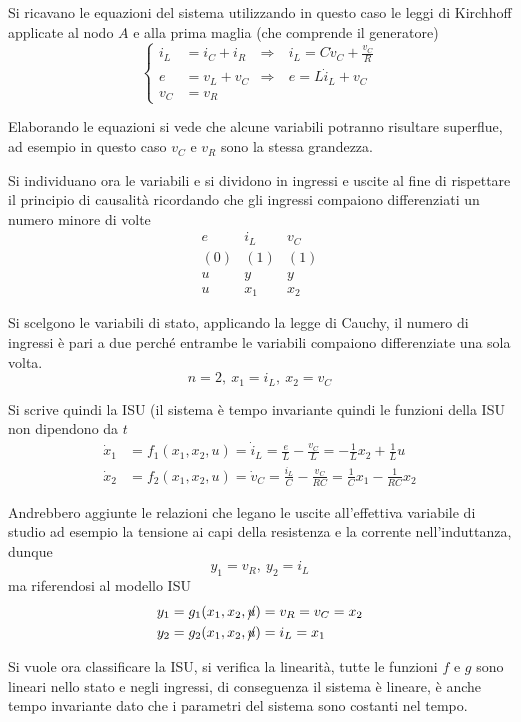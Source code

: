 Si ricavano le equazioni del sistema utilizzando in questo caso le leggi di Kirchhoff applicate al
nodo $A$ e alla prima maglia (che comprende il generatore)
$$\left\{\begin{aligned}
i_L &= i_C + i_R &\Rightarrow&\ i_L = C\dot{v}_C + \frac{v_C}{R}\\
e &= v_L + v_C &\Rightarrow&\ e = L\dot{i}_L + v_C\\
v_C &= v_R
\end{aligned}\right.
$$

Elaborando le equazioni si vede che alcune variabili potranno risultare superflue, ad esempio in
questo caso $v_C$ e $v_R$ sono la stessa grandezza.

Si individuano ora le variabili e si dividono in ingressi e uscite al fine di rispettare il
principio di causalità ricordando che gli ingressi compaiono differenziati un numero minore di volte
$$\begin{matrix}
e& i_L& v_C\\
(0) & (1) & (1)\\
u & y & y\\
u & x_1 & x_2
\end{matrix}
$$

Si scelgono le variabili di stato, applicando la legge di Cauchy, il numero di ingressi è pari a
due perché entrambe le variabili compaiono differenziate una sola volta.
$$
n=2,\ x_1 = i_L,\ x_2 = v_C
$$

Si scrive quindi la ISU (il sistema è tempo invariante quindi le funzioni della ISU non dipendono
da $t$
$$\begin{aligned}
\dot{x}_1 &= f_1(x_1,x_2,u) = \dot{i}_L = \frac{e}{L} - \frac{v_C}{L} = -\frac{1}{L}x_2 +
\frac{1}{L} u\\
\dot{x}_2 &= f_2(x_1,x_2,u) = \dot{v}_C = \frac{i_L}{C} - \frac{v_C}{RC} = \frac{1}{C}x_1 -
\frac{1}{RC}x_2
\end{aligned}$$

Andrebbero aggiunte le relazioni che legano le uscite all'effettiva variabile di studio ad esempio
la tensione ai capi della resistenza e la corrente nell'induttanza, dunque
$$
y_1 = v_R,\ y_2 = i_L
$$
ma riferendosi al modello ISU
$$\begin{aligned}
y_1 &= g_1(x_1,x_2,\cancel{u}) = v_R = v_C = x_2\\
y_2 &= g_2(x_1,x_2,\cancel{u}) = i_L = x_1
\end{aligned}$$

Si vuole ora classificare la ISU, si verifica la linearità, tutte le funzioni $f$ e $g$ sono
lineari nello stato e negli ingressi, di conseguenza il sistema è lineare, è anche tempo invariante
dato che i parametri del sistema sono costanti nel tempo.

